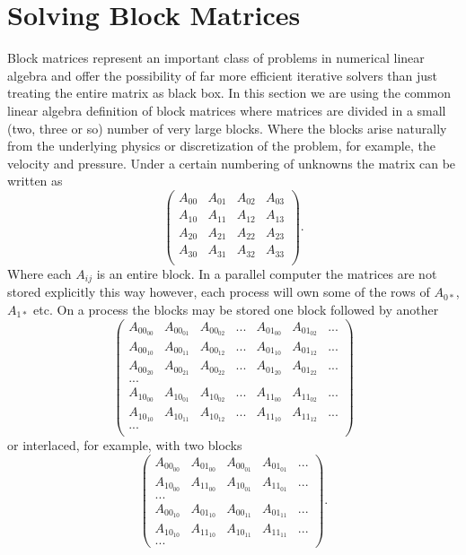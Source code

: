\section{Solving Block Matrices}
\label{sec_block_matrices}

Block matrices represent an important class of problems in numerical
linear algebra and offer the possibility of far more efficient
iterative solvers than just treating the entire matrix as black box. In
this section we are using the common linear algebra definition of
block matrices where matrices are divided in a small (two, three or
so) number of very large blocks. Where the blocks arise naturally from
the underlying physics or discretization of the problem, for example, the velocity and pressure. Under a
certain numbering of unknowns the matrix can be written as
\[
\left( \begin{array}{cccc}
A_{00}   & A_{01} & A_{02} & A_{03} \\
A_{10}   & A_{11} & A_{12} & A_{13} \\
A_{20}   & A_{21} & A_{22} & A_{23} \\
A_{30}   & A_{31} & A_{32} & A_{33} \\
\end{array} \right).
\]
Where each $ A_{ij}$ is an entire block.
In a parallel computer the matrices are not stored explicitly this way
however, each process will own some of the rows of $A_{0*}$, $A_{1*}$
etc. On a process the blocks may be stored one block followed by another
\[
\left( \begin{array}{ccccccc}
A_{{00}_{00}}   & A_{{00}_{01}} & A_{{00}_{02}} & ... & A_{{01}_{00}} & A_{{01}_{02}} & ...  \\
A_{{00}_{10}}   & A_{{00}_{11}} & A_{{00}_{12}} & ... & A_{{01}_{10}} & A_{{01}_{12}} & ... \\
A_{{00}_{20}}   & A_{{00}_{21}} & A_{{00}_{22}} & ... & A_{{01}_{20}} & A_{{01}_{22}}  & ...\\
... \\
A_{{10}_{00}}   & A_{{10}_{01}} & A_{{10}_{02}} & ... & A_{{11}_{00}} & A_{{11}_{02}}  & ... \\
A_{{10}_{10}}   & A_{{10}_{11}} & A_{{10}_{12}} & ... & A_{{11}_{10}} & A_{{11}_{12}}  & ... \\
... \\
\end{array} \right)
\]
or interlaced, for example, with two blocks
\[
\left( \begin{array}{ccccc}
A_{{00}_{00}}   & A_{{01}_{00}} &  A_{{00}_{01}} & A_{{01}_{01}} &  ... \\
A_{{10}_{00}}   & A_{{11}_{00}} &  A_{{10}_{01}} & A_{{11}_{01}} &  ... \\
... \\
A_{{00}_{10}}   & A_{{01}_{10}} & A_{{00}_{11}} & A_{{01}_{11}} & ...\\
A_{{10}_{10}}   & A_{{11}_{10}} & A_{{10}_{11}} & A_{{11}_{11}} & ...\\
...
\end{array} \right).
\]
